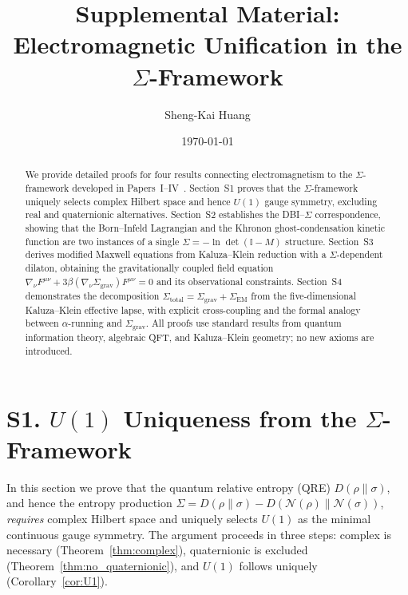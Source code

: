 \documentclass[letterpaper,twocolumn,superscriptaddress,longbibliography]{revtex4-2}
\newcommand{\chan}{\mathcal{N}}
\newcommand{\Sgrav}{\Sigma_{\mathrm{grav}}}
\newcommand{\SEM}{\Sigma_{\mathrm{EM}}}
\newcommand{\Stot}{\Sigma_{\mathrm{total}}}
\begin{document}
\title{Supplemental Material:\\
Electromagnetic Unification in the $\Sigma$-Framework}

\author{Sheng-Kai Huang}

\date{\today}

\begin{abstract}
We provide detailed proofs for four results connecting
electromagnetism to the $\Sigma$-framework developed in
Papers~I--IV~\cite{PaperI,PaperII,PaperIII,PaperIV}.
Section~S1 proves that the $\Sigma$-framework uniquely
selects complex Hilbert space and hence $U(1)$ gauge
symmetry, excluding real and quaternionic alternatives.
Section~S2 establishes the DBI--$\Sigma$ correspondence,
showing that the Born--Infeld Lagrangian and the Khronon
ghost-condensation kinetic function are two instances of
a single $\Sigma = -\ln\det(\mathbb{I} - M)$ structure.
Section~S3 derives modified Maxwell equations from
Kaluza--Klein reduction with a $\Sigma$-dependent dilaton,
obtaining the gravitationally coupled field equation
$\nabla_\nu F^{\mu\nu} + 3\beta(\nabla_\nu\Sgrav)F^{\mu\nu} = 0$
and its observational constraints.
Section~S4 demonstrates the decomposition
$\Stot = \Sgrav + \SEM$ from the five-dimensional
Kaluza--Klein effective lapse, with explicit cross-coupling
and the formal analogy between $\alpha$-running and $\Sgrav$.
All proofs use standard results from quantum information
theory, algebraic QFT, and Kaluza--Klein geometry;
no new axioms are introduced.
\end{abstract}

\maketitle

\tableofcontents

\section{S1. $U(1)$ Uniqueness from the $\Sigma$-Framework}
\label{sec:U1}

In this section we prove that the quantum relative entropy (QRE)
$D(\rho\|\sigma)$, and hence the entropy production
$\Sigma = D(\rho\|\sigma) - D(\chan(\rho)\|\chan(\sigma))$,
\emph{requires} complex Hilbert space and uniquely selects
$U(1)$ as the minimal continuous gauge symmetry.
The argument proceeds in three steps: complex is necessary
(Theorem~\ref{thm:complex}), quaternionic is excluded
(Theorem~\ref{thm:no_quaternionic}), and $U(1)$ follows
uniquely (Corollary~\ref{cor:U1}).
\end{document}
